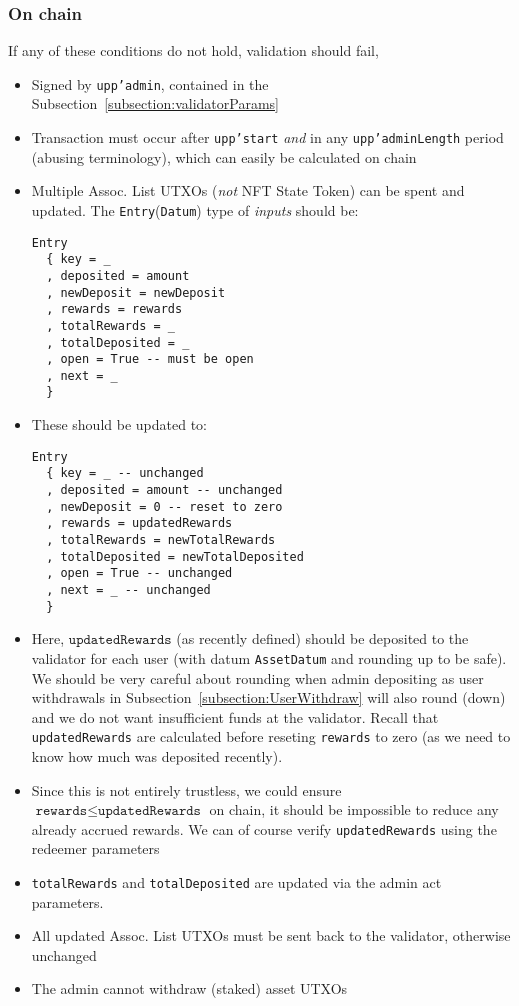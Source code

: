 \documentclass[10pt, a4paper]{article}
\theoremstyle{definition}
\begin{document}
\subsubsection{On chain}
If any of these conditions do not hold, validation should fail,
\begin{itemize}
\item{Signed by \texttt{upp'admin}, contained in the Subsection~\ref{subsection:validatorParams}}
\item{Transaction must occur after \texttt{upp'start} \textit{and} in any \texttt{upp'adminLength} period (abusing terminology), which can easily be calculated on chain}
\item{Multiple Assoc. List UTXOs (\textit{not} NFT State Token) can be spent and updated. The \texttt{Entry}(\texttt{Datum}) type of \textit{inputs} should be:
\begin{verbatim}
Entry
  { key = _
  , deposited = amount
  , newDeposit = newDeposit
  , rewards = rewards
  , totalRewards = _ 
  , totalDeposited = _
  , open = True -- must be open
  , next = _
  }
\end{verbatim}
}

\item{These should be updated to:
\begin{verbatim}
Entry
  { key = _ -- unchanged
  , deposited = amount -- unchanged
  , newDeposit = 0 -- reset to zero
  , rewards = updatedRewards
  , totalRewards = newTotalRewards 
  , totalDeposited = newTotalDeposited
  , open = True -- unchanged
  , next = _ -- unchanged
  }
\end{verbatim}

}



\item{Here, $\texttt{updatedRewards}$ (as recently defined) should be deposited to the validator for each user (with datum \texttt{AssetDatum} and rounding up to be safe).
We should be very careful about rounding when admin depositing as user withdrawals in Subsection~\ref{subsection:UserWithdraw} will also round (down) and we do not want insufficient funds at the validator. Recall that \texttt{updatedRewards} are calculated before reseting \texttt{rewards} to zero (as we need to know how much was deposited recently).
}
\item{Since this is not entirely trustless, we could ensure  $\texttt{rewards} \leq \texttt{updatedRewards}$ on chain, it should be impossible to reduce any already accrued rewards. We can of course verify \texttt{updatedRewards} using the redeemer parameters}
\item{\texttt{totalRewards} and \texttt{totalDeposited} are updated via the admin act parameters.}
\item{All updated Assoc. List UTXOs must be sent back to the validator, otherwise unchanged}
\item{The admin cannot withdraw (staked) asset UTXOs}
\end{itemize}
\end{document}
